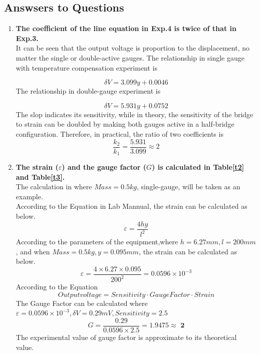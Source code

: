 \documentclass[11pt,a4paper,twoside]{article}
\begin{document}
\subsection{Answsers to Questions}
\begin{enumerate}
\item
\textbf{The coefficient of the line equation in Exp.4 is twice of that in Exp.3.} \\
It can be seen that the output voltage is proportion to the displacement, no matter the single or double-active gauges. The relationship in single gauge with temperature compensation experiment is 

	\begin{equation}
	\delta V = 3.099y + 0.0046
	\end{equation}
The relationship in double-gauge experiment is  

	\begin{equation}
	\delta V = 5.931y + 0.0752
	\end{equation}
The slop indicates its sensitivity, while in theory, the sensitivity of the bridge to strain can be doubled by making both gauges active in a half-bridge configuration. Therefore, in practical, the ratio of two coefficients is 
	\begin{equation}
	\frac{k_{2}}{k_{1}}= \frac{5.931}{3.099} \approx 2
	\end{equation}

\item
\textbf{The strain ($\varepsilon$) and the gauge factor ($G$) is calculated in Table\ref{t2} and Table\ref{t3}.}\\
The calculation in where $Mass=0.5kg$, single-gauge, will be taken as an example. \\
According to the Equation in Lab Mannual, the strain can be calculated as below.
	\begin{equation}
	\varepsilon = \frac{4hy}{l^{2}}
	\end{equation}
According to the parameters of the equipment,where $h=6.27mm, l=200mm$, and when $Mass=0.5kg, y=0.095mm$, the strain can be calculated as below. 
    \begin{equation*}
    \varepsilon = \frac{4 \times 6.27 \times 0.095}{200^{2}}=0.0596 \times 10^{-3}
    \end{equation*}
According to the Equation 
	\begin{equation}
	Output voltage = Sensitivity \cdot Gauge Factor \cdot Strain
	\end{equation}
The Gauge Factor can be calculated where $ \varepsilon =0.0596 \times 10^{-3},	\delta V =0.29 mV,  Sensitivity= 2.5$
	\begin{equation*}
	G = \frac{0.29}{0.0596\times 2.5}=1.9475\approx\textbf{ 2}
	\end{equation*}
The experimental value of gauge factor is approximate to its theoretical value. 


\end{enumerate}
\end{document}
